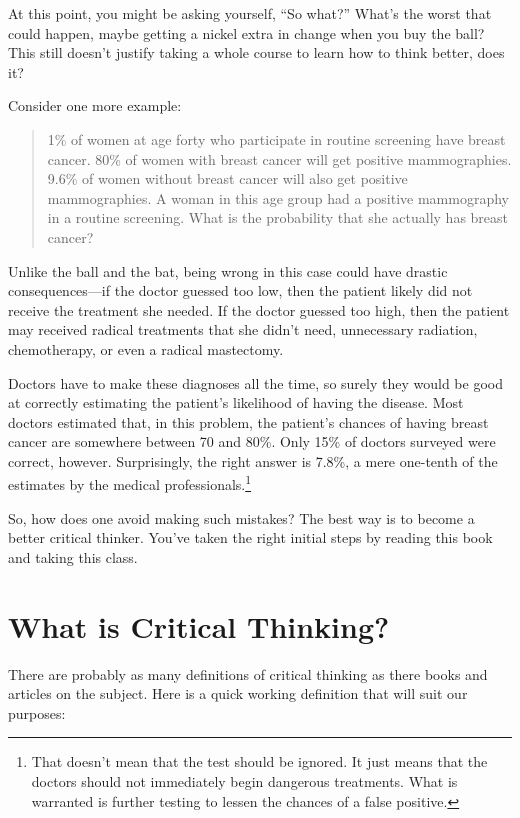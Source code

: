 At this point, you might be asking yourself, \enquote{So what?} What's the worst
that could happen, maybe getting a nickel extra in change when you buy
the ball? This still doesn't justify taking a whole course to learn how
to think better, does it?

Consider one more example:

\begin{quote}


1\% of women at age forty who participate in routine screening have
breast cancer. 80\% of women with breast cancer will get positive
mammographies. 9.6\% of women without breast cancer will also get
positive mammographies. A woman in this age group had a positive
mammography in a routine screening. What is the probability that she
actually has breast cancer?
\end{quote}

Unlike the ball and the bat, being wrong in this case could have drastic
consequences---if the doctor guessed too low, then the patient likely
did not receive the treatment she needed. If the doctor guessed too
high, then the patient may received radical treatments that she didn't
need, unnecessary radiation, chemotherapy, or even a radical mastectomy.

Doctors have to make these diagnoses all the time, so surely they would
be good at correctly estimating the patient's likelihood of having the
disease. Most doctors estimated that, in this problem, the patient's
chances of having breast cancer are somewhere between 70 and 80\%. Only
15\% of doctors surveyed were correct, however. Surprisingly, the right
answer is 7.8\%, a mere one-tenth of the estimates by the medical
professionals.\footnote{That doesn't mean that the test should be ignored. It just means
    that the doctors should not immediately begin dangerous treatments.
    What is warranted is further testing to lessen the chances of a
    false positive.}

So, how does one avoid making such mistakes? The best way is to become a
better critical thinker. You've taken the right initial steps by reading
this book and taking this class.

\section{What is Critical Thinking?}
\label{sec:what-is-ct}



There are probably as many definitions of critical thinking as there
books and articles on the subject. Here is a quick working definition
that will suit our purposes:

